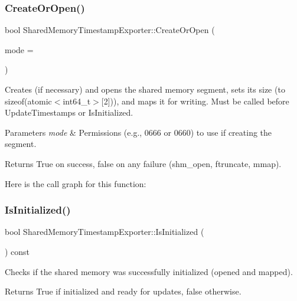 \subsubsection{\texorpdfstring{Create\+Or\+Open()}{CreateOrOpen()}}
{\footnotesize\ttfamily bool Shared\+Memory\+Timestamp\+Exporter\+::\+Create\+Or\+Open (\begin{DoxyParamCaption}\item[{mode\+\_\+t}]{mode = {} }\end{DoxyParamCaption})}



Creates (if necessary) and opens the shared memory segment, sets its size (to sizeof(atomic$<$int64\+\_\+t$>$\mbox{[}2\mbox{]})), and maps it for writing. Must be called before Update\+Timestamps or Is\+Initialized. 


\begin{DoxyParams}{Parameters}
{\em mode} & Permissions (e.\+g., 0666 or 0660) to use if creating the segment. \\
\hline
\end{DoxyParams}
\begin{DoxyReturn}{Returns}
True on success, false on any failure (shm\+\_\+open, ftruncate, mmap). 
\end{DoxyReturn}
Here is the call graph for this function\+:
\mbox{\label{classEventDetect_1_1SharedMemoryTimestampExporter_a3e058d7e830a8ae6bb59dfa7a7673a5c}} 
\subsubsection{\texorpdfstring{Is\+Initialized()}{IsInitialized()}}
{\footnotesize\ttfamily bool Shared\+Memory\+Timestamp\+Exporter\+::\+Is\+Initialized (\begin{DoxyParamCaption}{ }\end{DoxyParamCaption}) const}



Checks if the shared memory was successfully initialized (opened and mapped). 

\begin{DoxyReturn}{Returns}
True if initialized and ready for updates, false otherwise. 
\end{DoxyReturn}
\mbox{\label{classEventDetect_1_1SharedMemoryTimestampExporter_a7aab6c44488a85d6272606b2f733f2bc}} 
